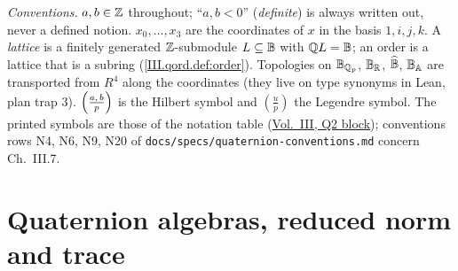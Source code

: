\noindent\emph{Conventions.} $a,b\in\mathbb{Z}$ throughout; ``$a,b<0$'' (\emph{definite}) is always written out, never a defined notion. $x_0,\dots,x_3$ are
the coordinates of $x$ in the basis $1,i,j,k$. A \emph{lattice} is a finitely generated $\mathbb{Z}$-submodule $L\subseteq\mathbb{B}$ with $\mathbb{Q} L=\mathbb{B}$; an order is
a lattice that is a subring (\cref{III.qord.def:order}). Topologies on $\mathbb{B}_{\mathbb{Q}_p}$, $\mathbb{B}_{\mathbb{R}}$, $\widehat{\mathbb{B}}$, $\mathbb{B}_{\mathbb{A}}$ are transported from $R^4$ along the
coordinates (they live on type synonyms in Lean, plan trap 3). $\Bigl(\tfrac{a,\,b}{p}\Bigr)$ is the Hilbert symbol and $(\frac up)$ the Legendre symbol. The printed
symbols are those of the notation table (\hyperref[notation:q2]{Vol.~III, Q2 block}); conventions rows N4, N6, N9, N20 of
\texttt{docs/specs/quaternion-conventions.md} concern Ch.~III.7.

\section{Quaternion algebras, reduced norm and trace}\label{sec:qalg-basic}

\begin{definition}
\end{definition}

\begin{definition}
\end{definition}

\begin{definition}
\end{definition}

